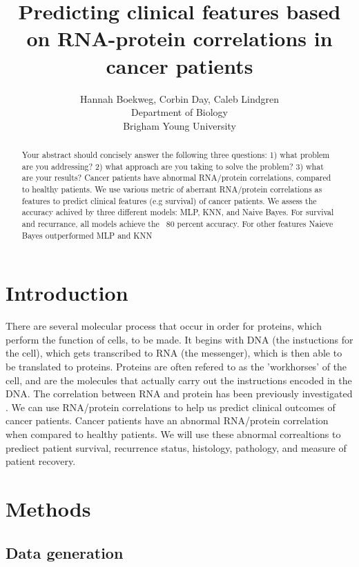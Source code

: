 \documentclass{article}
\title{Predicting clinical features based on RNA-protein correlations in cancer patients}
\author{Hannah Boekweg, Corbin Day, Caleb Lindgren \\
Department of Biology\\
Brigham Young University}
\begin{document}
\maketitle

\begin{abstract}
  Your abstract should concisely answer the following three questions: 1) what problem are you addressing? 2) what approach are you taking to solve the problem? 3) what are your results?
  Cancer patients have abnormal RNA/protein correlations, compared to healthy patients.
  We use various metric of aberrant RNA/protein correlations as features to predict clinical features (e.g survival) of cancer patients.
  We assess the accuracy achived by three different models: MLP, KNN, and Naive Bayes. For survival and recurrance, all models achieve the ~80 percent accuracy. For other features Naieve Bayes outperformed MLP and KNN

\end{abstract}

\section{Introduction}
There are several molecular process that occur in order for proteins, which perform the function of cells, to be made. 
It begins with DNA (the instuctions for the cell), which gets transcribed to RNA (the messenger), which is then able to be translated to proteins. 
Proteins are often refered to as the 'workhorses' of the cell, and are the molecules that actually carry out the instructions encoded in the DNA.
The correlation between RNA and protein has been previously investigated \cite{waldbauer_transcriptome_2012} \cite{payne_utility_2015} \cite{han_transcriptome_2021}.
We can use RNA/protein correlations to help us predict clinical outcomes of cancer patients. Cancer patients have an abnormal RNA/protein correlation when compared to healthy patients. 
We will use these abnormal correaltions to prediect patient survival, recurrence status, histology, pathology, and measure of patient recovery. 

\section{Methods}

\subsection{Data generation}
\end{document}
